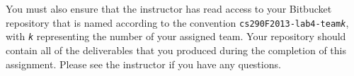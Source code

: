 You must also ensure that the instructor has read access to your Bitbucket repository that is named according to the
convention {\tt cs290F2013-lab4-team{\em k}}, with {\tt {\em k}} representing the number of your assigned team.  Your
repository should contain all of the deliverables that you produced during the completion of this assignment.  Please
see the instructor if you have any questions.



